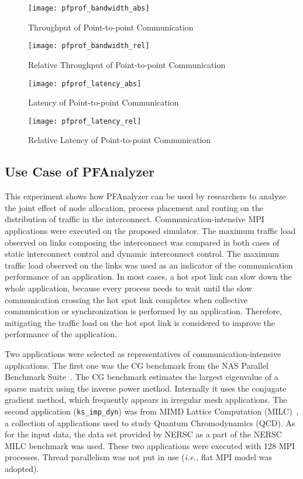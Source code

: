 \begin{figure}
    \centering
    \texttt{[image: pfprof\_bandwidth\_abs]}
    \caption{Throughput of Point-to-point Communication}%
    \label{fig:pfprof-bw-abs}
\end{figure}

\begin{figure}
    \centering
    \texttt{[image: pfprof\_bandwidth\_rel]}
    \caption{Relative Throughput of Point-to-point Communication}%
    \label{fig:pfprof-bw-rel}
\end{figure}

\begin{figure}
    \centering
    \texttt{[image: pfprof\_latency\_abs]}
    \caption{Latency of Point-to-point Communication}%
    \label{fig:pfprof-lat-abs}
\end{figure}

\begin{figure}
    \centering
    \texttt{[image: pfprof\_latency\_rel]}
    \caption{Relative Latency of Point-to-point Communication}%
    \label{fig:pfprof-lat-rel}
\end{figure}

\subsection{Use Case of PFAnalyzer}\label{sec:ii-simulation-results}

This experiment shows how PFAnalyzer can be used by researchers to analyze the
joint effect of node allocation, process placement and routing on the
distribution of traffic in the interconnect. Communication-intensive MPI
applications were executed on the proposed simulator. The maximum traffic load
observed on links composing the interconnect was compared in both cases of
static interconnect control and dynamic interconnect control. The maximum
traffic load observed on the links was used as an indicator of the
communication performance of an application. In most cases, a hot spot link
can slow down the whole application, because every process needs to wait until
the slow communication crossing the hot spot link completes when collective
communication or synchronization is performed by an application. Therefore,
mitigating the traffic load on the hot spot link is considered to improve the
performance of the application.

Two applications were selected as representatives of communication-intensive
applications. The first one was the CG benchmark from the NAS Parallel
Benchmark Suite~\autocite{Bailey1991}. The CG benchmark estimates the largest
eigenvalue of a sparse matrix using the inverse power method. Internally it
uses the conjugate gradient method, which frequently appears in irregular mesh
applications. The second application (\lstinline!ks_imp_dyn!) was from MIMD
Lattice Computation (MILC)~\autocite{milc}, a collection of applications used
to study Quantum Chromodynamics (QCD). As for the input data, the data set
provided by NERSC as a part of the NERSC MILC benchmark was used. These two
applications were executed with 128 MPI processes. Thread parallelism was not
put in use (\emph{i.e.,} flat MPI model was adopted).

